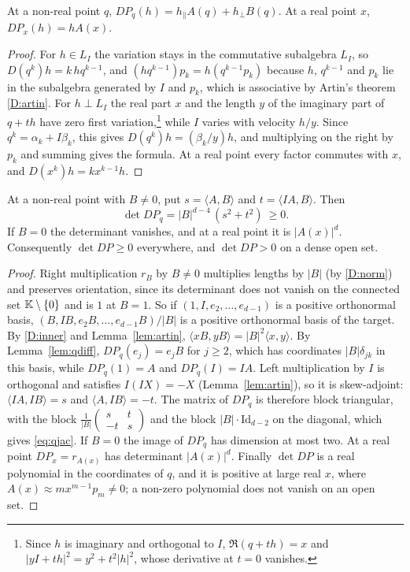\begin{lemma}\label{lem:qdiff}
At a non-real point $q$, $DP_q(h)=h_\parallel A(q)+h_\perp B(q)$. At a real point $x$, $DP_x(h)=hA(x)$.
\end{lemma}

\begin{proof}
For $h\in L_I$ the variation stays in the commutative subalgebra $L_I$, so $D(q^k)h=k\,hq^{k-1}$, and $(hq^{k-1})p_k=h(q^{k-1}p_k)$ because $h$, $q^{k-1}$ and $p_k$ lie in the subalgebra generated by $I$ and $p_k$, which is associative by Artin's theorem \ref{D:artin}. For $h\perp L_I$ the real part $x$ and the length $y$ of the imaginary part of $q+th$ have zero first variation,\footnote{Since $h$ is imaginary and orthogonal to $I$, $\Re(q+th)=x$ and $|yI+th|^2=y^2+t^2|h|^2$, whose derivative at $t=0$ vanishes.} while $I$ varies with velocity $h/y$. Since $q^k=\alpha_k+I\beta_k$, this gives $D(q^k)h=(\beta_k/y)h$, and multiplying on the right by $p_k$ and summing gives the formula. At a real point every factor commutes with $x$, and $D(x^k)h=kx^{k-1}h$.
\end{proof}

\begin{proposition}\label{prop:qjac}
At a non-real point with $B\neq0$, put $s=\langle A,B\rangle$ and $t=\langle IA,B\rangle$. Then
\begin{equation}\label{eq:qjac}
\det DP_q=|B|^{d-4}\,(s^2+t^2)\ \ge0 .
\end{equation}
If $B=0$ the determinant vanishes, and at a real point it is $|A(x)|^d$. Consequently $\det DP\ge0$ everywhere, and $\det DP>0$ on a dense open set.
\end{proposition}

\begin{proof}
Right multiplication $r_B$ by $B\neq0$ multiplies lengths by $|B|$ (by \ref{D:norm}) and preserves orientation, since its determinant does not vanish on the connected set $\mathbb{K}\setminus\{0\}$ and is $1$ at $B=1$. So if $(1,I,e_2,\dots,e_{d-1})$ is a positive orthonormal basis, $(B,IB,e_2B,\dots,e_{d-1}B)/|B|$ is a positive orthonormal basis of the target. By \ref{D:inner} and Lemma~\ref{lem:artin}, $\langle xB,yB\rangle=|B|^2\langle x,y\rangle$. By Lemma~\ref{lem:qdiff}, $DP_q(e_j)=e_jB$ for $j\ge2$, which has coordinates $|B|\delta_{jk}$ in this basis, while $DP_q(1)=A$ and $DP_q(I)=IA$. Left multiplication by $I$ is orthogonal and satisfies $I(IX)=-X$ (Lemma~\ref{lem:artin}), so it is skew-adjoint: $\langle IA,IB\rangle=s$ and $\langle A,IB\rangle=-t$. The matrix of $DP_q$ is therefore block triangular, with the block $\frac1{|B|}\left(\begin{smallmatrix}s&t\\-t&s\end{smallmatrix}\right)$ and the block $|B|\cdot\mathrm{Id}_{d-2}$ on the diagonal, which gives \eqref{eq:qjac}. If $B=0$ the image of $DP_q$ has dimension at most two. At a real point $DP_x=r_{A(x)}$ has determinant $|A(x)|^d$. Finally $\det DP$ is a real polynomial in the coordinates of $q$, and it is positive at large real $x$, where $A(x)\approx mx^{m-1}p_m\neq0$; a non-zero polynomial does not vanish on an open set.
\end{proof}

